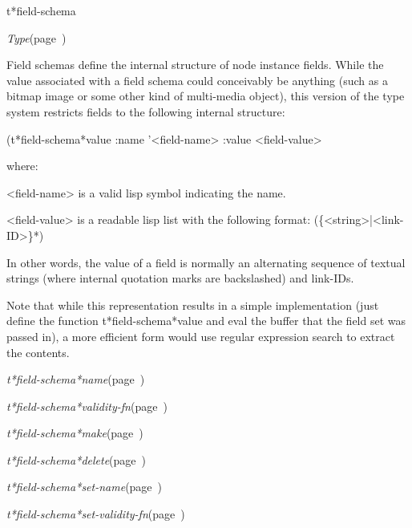\begin{description}
\item [Name:]  t*field-schema

\item [Layer:] {\sl Type}\hfill(page~\pageref{Type})

\item [Description:]

Field schemas define the internal structure of node
instance fields. While the value associated with a 
field schema could conceivably be anything (such as 
a bitmap image or some other kind of multi-media
object), this version of the type system restricts
fields to the following internal structure:

(t*field-schema*value :name '<field-name> 
                      :value <field-value>

where:

<field-name> is a valid lisp symbol indicating the name.

<field-value> is a readable lisp list with the 
following format: 
      (\{<string>|<link-ID>\}*)

In other words, the value of a field is normally an
alternating sequence of textual strings (where internal
quotation marks are backslashed) and link-IDs.
  
Note that while this representation results in a simple
implementation (just define the function
t*field-schema*value and eval the buffer that the field
set was passed in), a more efficient form would use
regular expression search to extract the contents.  

\item [Attributes:]
\item {\sl t*field-schema*name}\hfill(page~\pageref{t*field-schema*name})
\item {\sl t*field-schema*validity-fn}\hfill(page~\pageref{t*field-schema*validity-fn})


\item [Operations:]
\item {\sl t*field-schema*make}\hfill(page~\pageref{t*field-schema*make})
\item {\sl t*field-schema*delete}\hfill(page~\pageref{t*field-schema*delete})
\item {\sl t*field-schema*set-name}\hfill(page~\pageref{t*field-schema*set-name})
\item {\sl t*field-schema*set-validity-fn}\hfill(page~\pageref{t*field-schema*set-validity-fn})


\item [Subclasses:]


\item [Superclasses:]


\item [Instances:]



\end{description}
\horizontalline

